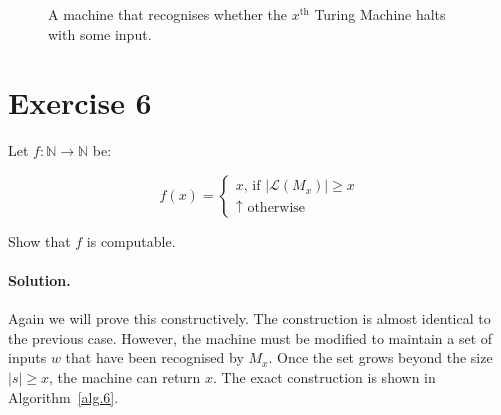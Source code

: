 \documentclass[11pt]{llncs}
\begin{document}
\begin{figure}[t]
\begin{algorithm}[H]
  \caption{\label{alg.5}
      A machine that recognises whether the $x^{\text{th}}$ Turing Machine
      halts with some input.
  }
  \begin{algorithmic}[1]
                      \State{}
                  \EndIf
              \EndFor
          \EndWhile
      \EndFunction
  \end{algorithmic}
\end{algorithm}
\end{figure}

\section*{Exercise 6}
Let $f: \mathbb{N} \rightarrow \mathbb{N}$ be:

\[
    f(x) = \begin{cases}
        x \text{, if } |\mathcal{L}(M_x)| \geq x\\
        \uparrow \text{ otherwise}
    \end{cases}
\]

Show that $f$ is computable.

\paragraph{Solution.}

Again we will prove this constructively. The construction is almost identical
to the previous case. However, the machine must be modified to maintain a set
of inputs $w$ that have been recognised by $M_x$. Once the set grows beyond the
size $|s| \geq x$, the machine can return $x$. The exact construction is shown
in Algorithm~\ref{alg.6}.
\end{document}
